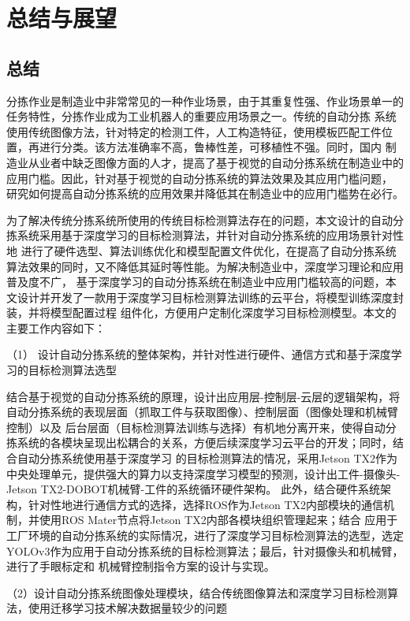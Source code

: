 
\chapter{总结与展望}

\section{总结}

分拣作业是制造业中非常常见的一种作业场景，由于其重复性强、作业场景单一的任务特性，分拣作业成为工业机器人的重要应用场景之一。传统的自动分拣
系统使用传统图像方法，针对特定的检测工件，人工构造特征，使用模板匹配工件位置，再进行分类。该方法准确率不高，鲁棒性差，可移植性不强。同时，国内
制造业从业者中缺乏图像方面的人才，提高了基于视觉的自动分拣系统在制造业中的应用门槛。因此，针对基于视觉的自动分拣系统的算法效果及其应用门槛问题，
研究如何提高自动分拣系统的应用效果并降低其在制造业中的应用门槛势在必行。

为了解决传统分拣系统所使用的传统目标检测算法存在的问题，本文设计的自动分拣系统采用基于深度学习的目标检测算法，并针对自动分拣系统的应用场景针对性地
进行了硬件选型、算法训练优化和模型配置文件优化，在提高了自动分拣系统算法效果的同时，又不降低其延时等性能。为解决制造业中，深度学习理论和应用普及度不广，
基于深度学习的自动分拣系统在制造业中应用门槛较高的问题，本文设计并开发了一款用于深度学习目标检测算法训练的云平台，将模型训练深度封装，并将模型配置过程
组件化，方便用户定制化深度学习目标检测模型。本文的主要工作内容如下：

（1） 设计自动分拣系统的整体架构，并针对性进行硬件、通信方式和基于深度学习的目标检测算法选型

结合基于视觉的自动分拣系统的原理，设计出应用层-控制层-云层的逻辑架构，将自动分拣系统的表现层面（抓取工件与获取图像）、控制层面（图像处理和机械臂控制）以及
后台层面（目标检测算法训练与选择）有机地分离开来，使得自动分拣系统的各模块呈现出松耦合的关系，方便后续深度学习云平台的开发；同时，结合自动分拣系统使用基于深度学习
的目标检测算法的情况，采用Jetson TX2作为中央处理单元，提供强大的算力以支持深度学习模型的预测，设计出工件-摄像头-Jetson TX2-DOBOT机械臂-工件的系统循环硬件架构。
此外，结合硬件系统架构，针对性地进行通信方式的选择，选择ROS作为Jetson TX2内部模块的通信机制，并使用ROS Mater节点将Jetson TX2内部各模块组织管理起来；结合
应用于工厂环境的自动分拣系统的实际情况，进行了深度学习目标检测算法的选型，选定YOLOv3作为应用于自动分拣系统的目标检测算法；最后，针对摄像头和机械臂，进行了手眼标定和
机械臂控制指令方案的设计与实现。

（2）设计自动分拣系统图像处理模块，结合传统图像算法和深度学习目标检测算法，使用迁移学习技术解决数据量较少的问题

